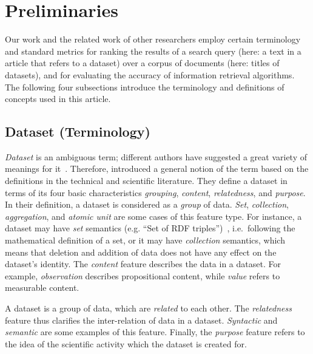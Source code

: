 \documentclass{IOS-Book-Article}
\begin{document}
\section{Preliminaries}
\label{sec:preliminaries}
Our work and the related work of other researchers employ certain terminology and standard metrics for ranking the results of a search query (here: a text in a article that refers to a dataset) over a corpus of documents (here: titles of datasets), and for evaluating the accuracy of information retrieval algorithms.
The following four subsections introduce the terminology and definitions of concepts used in this article.

\subsection{Dataset (Terminology)} 
\emph{Dataset} is an ambiguous term; different authors have suggested a great variety of meanings for it~\cite{peplerpreservation}.
Therefore, \citeauthor{renear2010definitions} introduced a general notion of the term based on the definitions in the technical and scientific literature.
They define a dataset in terms of its four basic characteristics \emph{grouping}, \emph{content}, \emph{relatedness}, and \emph{purpose}.
In their definition, a dataset is considered as a \emph{group} of data.  \emph{Set}, \emph{collection}, \emph{aggregation}, and \emph{atomic unit} are some cases of this feature type.
For instance, a dataset may have \emph{set} semantics (e.g. “Set of RDF triples”)~\cite{renear2010definitions}, i.e.\ following the mathematical definition of a set, or it may have \emph{collection} semantics, which means that deletion and addition of data does not have any effect on the dataset's identity.
The \emph{content} feature describes the data in a dataset.
For example, \emph{observation} describes propositional content, while \emph{value} refers to measurable content.

A dataset is a group of data, which are \emph{related} to each other.
The \emph{relatedness} feature thus clarifies the inter-relation of data in a dataset.
\emph{Syntactic} and \emph{semantic} are some examples of this feature.   
Finally, the \emph{purpose} feature refers to the idea of the scientific activity which the dataset is created for.
\end{document}
